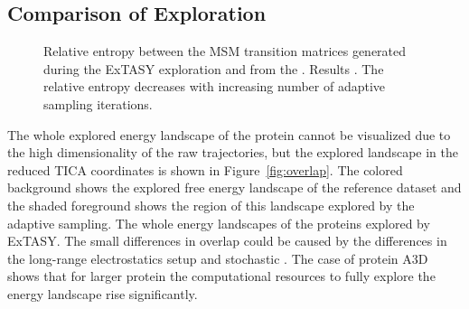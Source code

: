 \subsection{\label{sec:time-fold}Comparison of Exploration}
\begin{figure}[!htb]
   
   \begin{subfigure}[b]{0.85\linewidth}
   {}
   \end{subfigure}%
   
  \caption{
  Relative entropy between the MSM transition matrices generated during the
  ExTASY exploration and from the . Results . The relative entropy decreases with increasing number of adaptive
  sampling iterations. }
  \label{fig:rel_ent}
\end{figure}

The whole explored energy landscape of the protein cannot be visualized due to
the high dimensionality of the raw trajectories, but the explored landscape in
the reduced TICA coordinates is shown in
Figure~\ref{fig:overlap}. The colored background shows the explored free energy landscape of
the reference dataset and the shaded foreground shows the region of this landscape explored
by the adaptive sampling. The whole energy landscapes of the proteins explored by ExTASY. The small differences in overlap could be
caused by the differences in the long-range electrostatics setup and stochastic . The case of protein A3D shows that for larger protein the computational resources to fully explore the energy landscape rise significantly. 

